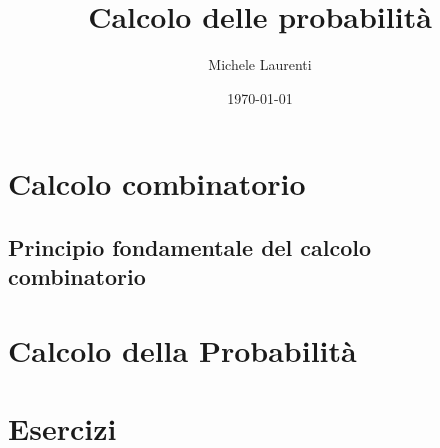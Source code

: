\documentclass[12pt,a4paper,draft]{article}
\theoremstyle{plain}%
\theoremstyle{definition}
\theoremstyle{remark}
\begin{document}
\title{Calcolo delle probabilit\`a}
\author{Michele Laurenti}
\date{\today}

\maketitle

\newpage

\tableofcontents
\newpage

\section{Calcolo combinatorio}

\subsection{Principio fondamentale del calcolo combinatorio}



\newpage

\section{Calcolo della Probabilit\`a}



\newpage

\section{Esercizi}


\end{document}
